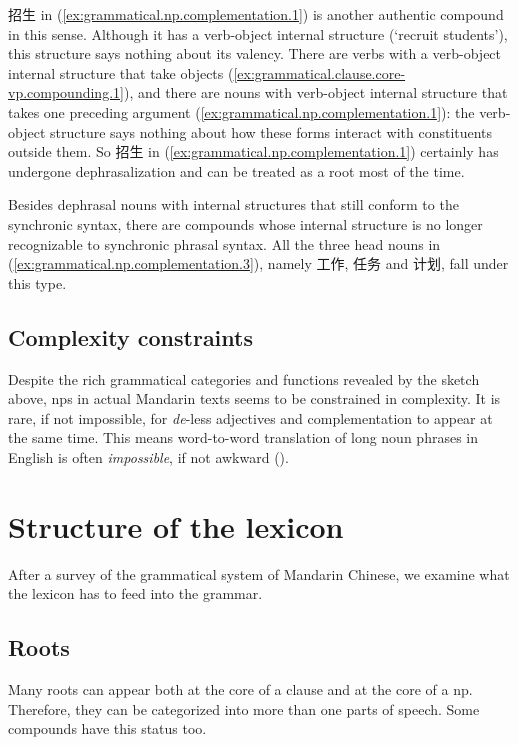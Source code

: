 \documentclass[UTF8, a4paper, oneside, scheme=plain, 12pt]{ctexrep}
\newcommand{\form}[1]{\emph{#1}}
\newcommand{\translate}[1]{`#1'}
\begin{document}
招生 in (\ref{ex:grammatical.np.complementation.1}) is another authentic compound in this sense.
Although it has a verb-object internal structure (\translate{recruit students}),
this structure says nothing about its valency.
There are verbs with a verb-object internal structure
that take objects (\ref{ex:grammatical.clause.core-vp.compounding.1}),
and there are nouns with verb-object internal structure 
that takes one preceding argument (\ref{ex:grammatical.np.complementation.1}):
the verb-object structure says nothing about how these forms
interact with constituents outside them.
So 招生 in (\ref{ex:grammatical.np.complementation.1})
certainly has undergone dephrasalization and
can be treated as a root most of the time.

Besides dephrasal nouns with internal structures that still conform to the synchronic syntax,
there are compounds whose internal structure is no longer recognizable
to synchronic phrasal syntax.
All the three head nouns in (\ref{ex:grammatical.np.complementation.3}),
namely 工作, 任务 and 计划, fall under this type.

\subsection{Complexity constraints}\label{sec:grammatical.np.complexity}

Despite the rich grammatical categories and functions revealed by the sketch above,
\acp{np} in actual Mandarin texts seems to be constrained in complexity.
It is rare, if not impossible, for \form{de}-less adjectives and complementation to appear at the same time.
This means word-to-word translation of long noun phrases in English is often \emph{impossible},
if not awkward ().

\section{Structure of the lexicon}\label{sec:grammatical.lexicon}

After a survey of the grammatical system of Mandarin Chinese,
we examine what the lexicon has to feed into the grammar.

\subsection{Roots}\label{sec:grammatical.lexicon.roots}

Many roots can appear both at the core of a clause and at the core of a \ac{np}.
Therefore, they can be categorized into more than one parts of speech.
Some compounds have this status too.
\end{document}
